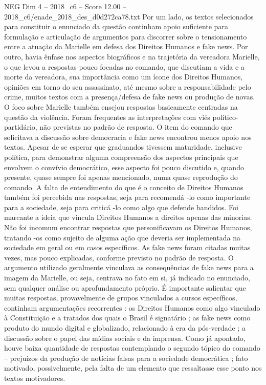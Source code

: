 \begin{textsample}{NEG Dim 4 – 2018\_c6 – Score 12.00 – 2018\_c6/enade\_2018\_des\_d0d272ca78.txt}
Por um lado, os textos selecionados para constituir o enunciado da questão continham apoio suficiente para formulação e articulação de argumentos para discorrer sobre o tensionamento entre a atuação da Marielle em defesa dos Direitos Humanos e fake news.
Por outro, havia ênfase nos aspectos biográficos e na trajetória da vereadora Marielle, o que levou a respostas pouco focadas no comando, que discutiam a vida e a morte da vereadora, sua importância como um ícone dos Direitos Humanos, opiniões em torno do seu assassinato, até mesmo sobre a responsabilidade pelo crime, muitos textos com a presença/defesa de fake news ou produção de novas.
O foco sobre Marielle também ensejou respostas basicamente centradas na questão da violência.
Foram frequentes as interpretações com viés político-partidário, não previstas no padrão de resposta.
O item do comando que solicitava a discussão sobre democracia e fake news encontrou menos apoio nos textos.
Apesar de se esperar que graduandos tivessem maturidade, inclusive política, para demonstrar alguma compreensão dos aspectos principais que envolvem o convívio democrático, esse aspecto foi pouco discutido e, quando presente, quase sempre foi apenas mencionado, numa quase reprodução do comando.
A falta de entendimento do que é o conceito de Direitos Humanos também foi percebida nas respostas, seja para recomendá -lo como importante para a sociedade, seja para criticá -lo como algo que defende bandidos.
Foi marcante a ideia que vincula Direitos Humanos a direitos apenas das minorias.
Não foi incomum encontrar respostas que personificavam os Direitos Humanos, tratando -os como sujeito de alguma ação que deveria ser implementada na sociedade em geral ou em casos específicos.
As fake news foram citadas muitas vezes, mas pouco explicadas, conforme previsto no padrão de resposta.
O argumento utilizado geralmente vinculava as consequências de fake news para a imagem da Marielle, ou seja, centrava no fato em si, já indicado no enunciado, sem qualquer análise ou aprofundamento próprio.
É importante salientar que muitas respostas, provavelmente de grupos vinculados a cursos específicos, continham argumentações recorrentes : os Direitos Humanos como algo vinculado à Constituição e a tratados dos quais o Brasil é signatário ; as fake news como produto do mundo digital e globalizado, relacionado à era da pós-verdade ; a discussão sobre o papel das mídias sociais e da imprensa.
Como já apontado, houve baixa quantidade de respostas contemplando o segundo tópico do comando – prejuízos da produção de notícias falsas para a sociedade democrática ; fato motivado, possivelmente, pela falta de um elemento que ressaltasse esse ponto nos textos motivadores.

\end{textsample}
